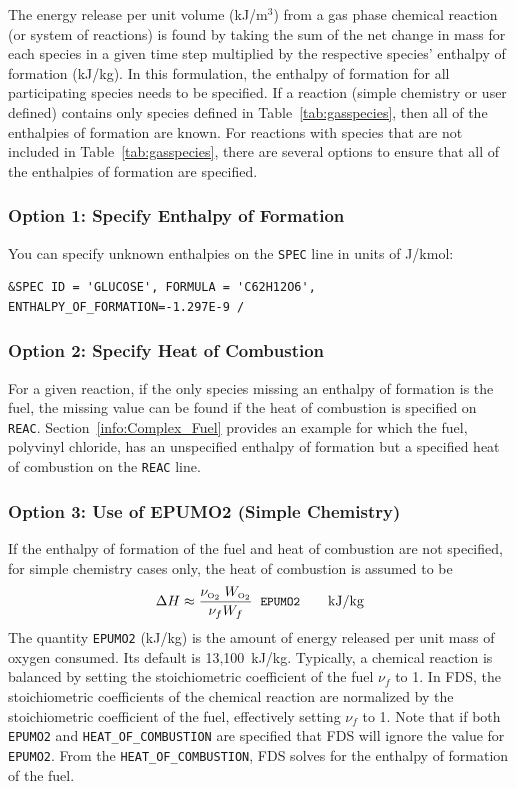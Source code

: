 \documentclass[11pt]{book}
\newcommand{\ct}{\tt\small}
\newcommand{\OTWO}{{\tiny \hbox{O}_2}}
\begin{document}
The energy release per unit volume (kJ/m$^3$) from a gas phase chemical reaction (or system of reactions) is found by taking the sum of the net change in mass for each species in a given time step multiplied by the respective species' enthalpy of formation (kJ/kg). In this formulation, the enthalpy of formation for all participating species needs to be specified. If a reaction (simple chemistry or user defined) contains only species defined in Table~\ref{tab:gasspecies}, then all of the enthalpies of formation are known. For reactions with species that are not included in Table~\ref{tab:gasspecies}, there are several options to ensure that all of the enthalpies of formation are specified.

\subsubsection{Option 1: Specify Enthalpy of Formation}
You can specify unknown enthalpies on the {\ct SPEC} line in units of J/kmol:

\footnotesize
\begin{verbatim}
&SPEC ID = 'GLUCOSE', FORMULA = 'C62H12O6', ENTHALPY_OF_FORMATION=-1.297E-9 /
\end{verbatim}
\normalsize

\subsubsection{Option 2: Specify Heat of Combustion}
For a given reaction, if the only species missing an enthalpy of formation is the fuel, the missing value can be found if the heat of combustion is specified on {\ct REAC}. Section~\ref{info:Complex_Fuel} provides an example for which the fuel, polyvinyl chloride, has an unspecified enthalpy of formation but a specified heat of combustion on the {\ct REAC} line.

\subsubsection{Option 3: Use of EPUMO2 (Simple Chemistry)}
If the enthalpy of formation of the fuel and heat of combustion are not specified, for simple chemistry cases only, the heat of combustion is assumed to be
\begin{equation}
\Delta H \approx \frac{\nu_{\OTWO} \; W_{\OTWO} } { \nu_{f} W_{f} } \; \; \hbox{\ct EPUMO2}  \quad \quad \hbox{kJ/kg}
\label{EPUMO2}
\end{equation}
The quantity {\ct EPUMO2} (kJ/kg) is the amount of energy released per unit mass of oxygen consumed.
Its default is 13,100~kJ/kg. Typically, a chemical reaction is balanced by setting
the stoichiometric coefficient of the fuel $\nu_{f}$ to 1. In FDS, the stoichiometric coefficients of
the chemical reaction are normalized by the  stoichiometric coefficient of the fuel, effectively setting $\nu_{f}$ to 1.
Note that if both {\ct EPUMO2} and {\ct HEAT\_OF\_COMBUSTION} are specified that FDS will ignore
the value for {\ct EPUMO2}. From the {\ct HEAT\_OF\_COMBUSTION}, FDS solves for the enthalpy of formation of the fuel.
\end{document}
